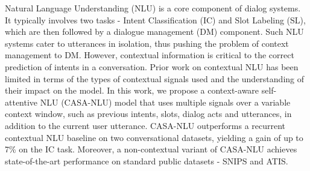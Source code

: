 Natural Language Understanding (NLU) is a core component of dialog systems. It typically involves two tasks - Intent Classification (IC) and Slot Labeling (SL), which are then followed by a dialogue management (DM) component. Such NLU systems cater to utterances in isolation, thus pushing the problem of context management to DM. However, contextual information is critical to the correct prediction of intents in a conversation. Prior work on contextual NLU has been limited in terms of the types of contextual signals used and the understanding of their impact on the model. In this work, we propose a context-aware self-attentive NLU (CASA-NLU) model that uses multiple signals over a variable context window, such as previous intents, slots, dialog acts and utterances, in addition to the current user utterance. CASA-NLU outperforms a recurrent contextual NLU baseline on two conversational datasets, yielding a gain of up to 7\% on the IC task. Moreover, a non-contextual variant of CASA-NLU achieves state-of-the-art performance on standard public datasets - SNIPS and ATIS.